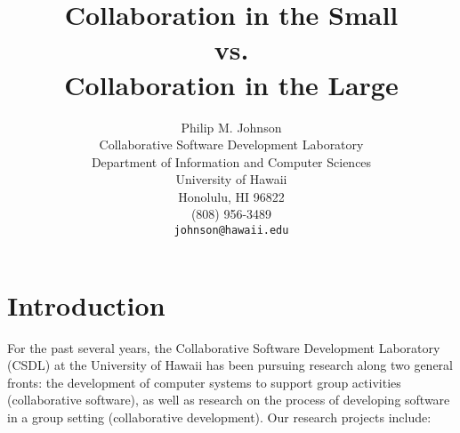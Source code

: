 




\title {Collaboration in the Small \\ vs. \\ Collaboration in the Large}
\author  {Philip M. Johnson\\
          Collaborative Software Development Laboratory\\
          Department of Information and Computer Sciences\\
          University of Hawaii\\
          Honolulu, HI 96822\\
          (808) 956-3489\\
          {\tt johnson@hawaii.edu}}

\maketitle

\section{Introduction}

For the past several years, the Collaborative Software Development 
Laboratory (CSDL) at the University of Hawaii has been
pursuing research along two general fronts: the development of computer
systems to support group activities (collaborative software), as well as
research on the process of developing software in a group setting
(collaborative development).  Our research projects include:


